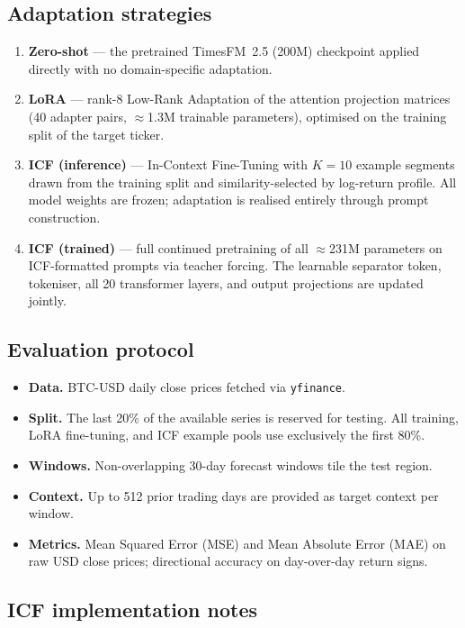 \documentclass[11pt,a4paper]{article}
\begin{document}
\subsection{Adaptation strategies}
\begin{enumerate}
  \item \textbf{Zero-shot} --- the pretrained TimesFM~2.5 (200M) checkpoint applied directly with no domain-specific adaptation.
  \item \textbf{LoRA} --- rank-8 Low-Rank Adaptation of the attention projection matrices (40 adapter pairs, $\approx$1.3M trainable parameters), optimised on the training split of the target ticker.
  \item \textbf{ICF (inference)} --- In-Context Fine-Tuning \citep[ICF;][]{ICFTS2024} with $K=10$ example segments drawn from the training split and similarity-selected by log-return profile. All model weights are frozen; adaptation is realised entirely through prompt construction.
  \item \textbf{ICF (trained)} --- full continued pretraining of all $\approx$231M parameters on ICF-formatted prompts via teacher forcing. The learnable separator token, tokeniser, all 20 transformer layers, and output projections are updated jointly.
\end{enumerate}

\subsection{Evaluation protocol}
\begin{itemize}
  \item \textbf{Data.} BTC-USD daily close prices fetched via \texttt{yfinance}.
  \item \textbf{Split.} The last 20\% of the available series is reserved for testing. All training, LoRA fine-tuning, and ICF example pools use exclusively the first 80\%.
  \item \textbf{Windows.} Non-overlapping 30-day forecast windows tile the test region.
  \item \textbf{Context.} Up to 512 prior trading days are provided as target context per window.
  \item \textbf{Metrics.} Mean Squared Error (MSE) and Mean Absolute Error (MAE) on raw USD close prices; directional accuracy on day-over-day return signs.
\end{itemize}

\subsection{ICF implementation notes}
\end{document}
